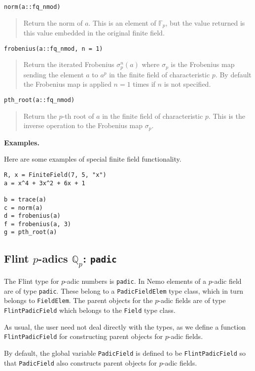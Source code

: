 \documentclass[a4paper,10pt]{article}
\newcommand{\Q}{\mathbb{Q}}
\newcommand{\F}{\mathbb{F}}
\newcommand{\code}{\lstinline}
\newcommand{\desc}[1]{\vspace{-3mm}\begin{quote}#1\end{quote}}
\begin{document}
{{\begin{lstlisting}
norm(a::fq_nmod)
\end{lstlisting}

\desc{Return the norm of $a$. This is an element of $\F_p$, but the value
returned is this value embedded in the original finite field.}

\begin{lstlisting}
frobenius(a::fq_nmod, n = 1)
\end{lstlisting}

\desc{Return the iterated Frobenius $\sigma_p^n(a)$ where $\sigma_p$ is the 
Frobenius map sending the element $a$ to $a^p$ in the finite field of 
characteristic $p$. By default the Frobenius map is applied $n = 1$ times if
$n$ is not specified.}

\begin{lstlisting}
pth_root(a::fq_nmod)
\end{lstlisting}

\desc{Return the $p$-th root of $a$ in the finite field of characteristic
$p$. This is the inverse operation to the Frobenius map $\sigma_p$.}

\textbf{Examples.}

Here are some examples of special finite field functionality.

\begin{lstlisting}
R, x = FiniteField(7, 5, "x")
a = x^4 + 3x^2 + 6x + 1

b = trace(a)
c = norm(a)
d = frobenius(a)
f = frobenius(a, 3)
g = pth_root(a)
\end{lstlisting}

\subsection{Flint $p$-adics $\Q_p$: \code{padic}}

The Flint type for $p$-adic numbers is \code{padic}. In Nemo elements of a
$p$-adic field are of type \code{padic}. These belong to a \code{PadicFieldElem}
type class, which in turn belongs to \code{FieldElem}. The parent objects for 
the $p$-adic fields are of type \code{FlintPadicField} which belongs to the
\code{Field} type class.

As usual, the user need not deal directly with the types, as we define a function
\code{FlintPadicField} for constructing parent objects for $p$-adic fields.

By default, the global variable \code{PadicField} is defined to be
\code{FlintPadicField} so that \code{PadicField} also constructs parent objects
for $p$-adic fields.

}}
\end{document}
